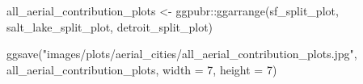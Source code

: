 \documentclass[
  letterpaper,
  DIV=11,
  numbers=noendperiod]{scrreprt}
\newenvironment{Shaded}{\begin{snugshade}}{\end{snugshade}}
\newcommand{\AttributeTok}[1]{\textcolor[rgb]{0.40,0.45,0.13}{#1}}
\newcommand{\DecValTok}[1]{\textcolor[rgb]{0.68,0.00,0.00}{#1}}
\newcommand{\FunctionTok}[1]{\textcolor[rgb]{0.28,0.35,0.67}{#1}}
\newcommand{\NormalTok}[1]{\textcolor[rgb]{0.00,0.23,0.31}{#1}}
\newcommand{\OtherTok}[1]{\textcolor[rgb]{0.00,0.23,0.31}{#1}}
\newcommand{\SpecialCharTok}[1]{\textcolor[rgb]{0.37,0.37,0.37}{#1}}
\newcommand{\StringTok}[1]{\textcolor[rgb]{0.13,0.47,0.30}{#1}}
\begin{document}
\begin{Shaded}
\begin{Highlighting}[]
\NormalTok{all\_aerial\_contribution\_plots }\OtherTok{\textless{}{-}}\NormalTok{ ggpubr}\SpecialCharTok{::}\FunctionTok{ggarrange}\NormalTok{(sf\_split\_plot, }
\NormalTok{                                                   salt\_lake\_split\_plot, }
\NormalTok{                                                   detroit\_split\_plot)}

\FunctionTok{ggsave}\NormalTok{(}\StringTok{"images/plots/aerial\_cities/all\_aerial\_contribution\_plots.jpg"}\NormalTok{, }
\NormalTok{       all\_aerial\_contribution\_plots, }
       \AttributeTok{width =} \DecValTok{7}\NormalTok{, }
       \AttributeTok{height =} \DecValTok{7}\NormalTok{)}
\end{Highlighting}
\end{Shaded}
\end{document}
